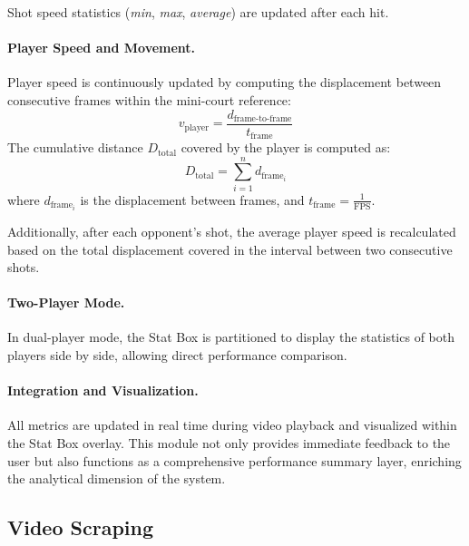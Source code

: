 Shot speed statistics (\textit{min}, \textit{max}, \textit{average}) are updated after each hit.

\paragraph{Player Speed and Movement.}  
Player speed is continuously updated by computing the displacement between consecutive frames within the mini-court reference:
\[
v_{\text{player}} = \frac{d_{\text{frame-to-frame}}}{t_{\text{frame}}}
\]
The cumulative distance $D_{\text{total}}$ covered by the player is computed as:
\[
D_{\text{total}} = \sum_{i=1}^{n} d_{\text{frame}_i}
\]
where $d_{\text{frame}_i}$ is the displacement between frames, and $t_{\text{frame}} = \frac{1}{\text{FPS}}$.

Additionally, after each opponent's shot, the average player speed is recalculated based on the total displacement covered in the interval between two consecutive shots.

\paragraph{Two-Player Mode.}  
In dual-player mode, the Stat Box is partitioned to display the statistics of both players side by side, allowing direct performance comparison.

\paragraph{Integration and Visualization.}  
All metrics are updated in real time during video playback and visualized within the Stat Box overlay.  
This module not only provides immediate feedback to the user but also functions as a comprehensive performance summary layer, enriching the analytical dimension of the system.

\subsection{Video Scraping} %

